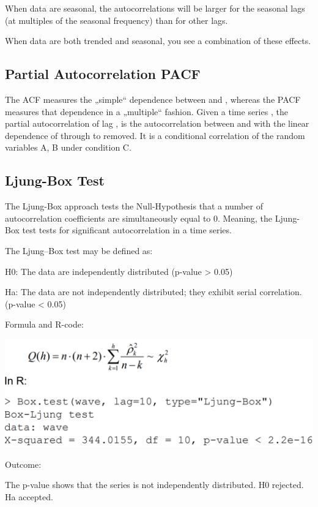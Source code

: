 \documentclass[
]{article}
\begin{document}
When data are seasonal, the autocorrelations will be larger for the
seasonal lags (at multiples of the seasonal frequency) than for other
lags.

When data are both trended and seasonal, you see a combination of these
effects.

\hypertarget{partial-autocorrelation-pacf}{%
\subsection{Partial Autocorrelation
PACF}\label{partial-autocorrelation-pacf}}

The ACF measures the „simple`` dependence between and , whereas the PACF
measures that dependence in a „multiple`` fashion. Given a time series ,
the partial autocorrelation of lag , is the autocorrelation between and
with the linear dependence of through to removed. It is a conditional
correlation of the random variables A, B under condition C.

\hypertarget{ljung-box-test}{%
\subsection{Ljung-Box Test}\label{ljung-box-test}}

The Ljung-Box approach tests the Null-Hypothesis that a number of
autocorrelation coefficients are simultaneously equal to 0. Meaning, the
Ljung-Box test tests for significant autocorrelation in a time series.

The Ljung--Box test may be defined as:

H0: The data are independently distributed (p-value \textgreater{} 0.05)

Ha: The data are not independently distributed; they exhibit serial
correlation. (p-value \textless{} 0.05)

Formula and R-code:

\includegraphics[width=1\linewidth]{ljung}

Outcome:

The p-value shows that the series is not independently distributed. H0
rejected. Ha accepted.
\end{document}
